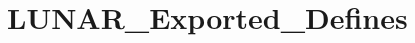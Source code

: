 \hypertarget{group___l_u_n_a_r___exported___defines}{}\section{L\+U\+N\+A\+R\+\_\+\+Exported\+\_\+\+Defines}
\label{group___l_u_n_a_r___exported___defines}
